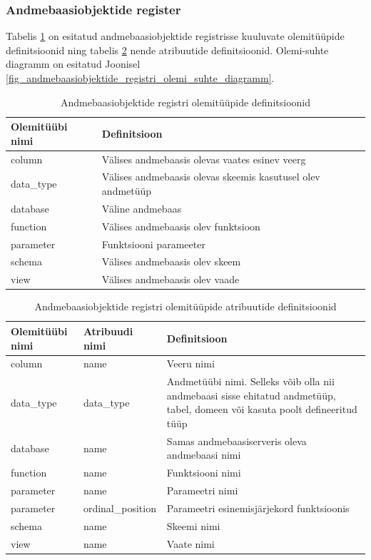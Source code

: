 \documentclass[a4paper,12pt]{article} %
\begin{document}
\subsubsection{Andmebaasiobjektide register}
Tabelis \ref{table_er_andmebaasiobjektide_registri_olemitüüpide_definitsioonid} on esitatud andmebaasiobjektide registrisse kuuluvate olemitüüpide definitsioonid ning tabelis \ref{table_er_andmebaasiobjektide_registri_olemitüüpide_atribuutide_definitsioonid} nende atribuutide definitsioonid. Olemi-suhte diagramm on esitatud Joonisel \ref{fig_andmebaasiobjektide_registri_olemi_suhte_diagramm}.

\begin{table}[H]
\centering
\caption{Andmebaasiobjektide registri olemitüüpide definitsioonid}
\label{table_er_andmebaasiobjektide_registri_olemitüüpide_definitsioonid}
\begin{tabular}{|p{4cm}|p{11cm}|}
\hline
\rowcolor{rowgray}
Olemitüübi nimi & Definitsioon \\ \hline
column & Välises andmebaasis olevas vaates esinev veerg\\ \hline
data\_type & Välises andmebaasis olevas skeemis kasutusel olev andmetüüp\\ \hline
database & Väline andmebaas \\ \hline
function & Välises andmebaasis olev funktsioon\\ \hline
parameter & Funktsiooni parameeter\\ \hline
schema & Välises andmebaasis olev skeem\\ \hline
view & Välises andmebaasis olev vaade\\ \hline
\end{tabular}
\end{table}

\begin{table}[H]
\centering
\caption{Andmebaasiobjektide registri olemitüüpide atribuutide definitsioonid}
\label{table_er_andmebaasiobjektide_registri_olemitüüpide_atribuutide_definitsioonid}
\begin{tabular}{|p{4cm}|p{4cm}|p{7cm}|}
\hline
\rowcolor{rowgray}
Olemitüübi nimi & Atribuudi nimi & Definitsioon \\ \hline
column & name & Veeru nimi \\ \hline
data\_type & data\_type & Andmetüübi nimi. Selleks võib olla nii andmebaasi sisse ehitatud andmetüüp, tabel, domeen või kasuta poolt defineeritud tüüp \\ \hline
database & name & Samas andmebaasiserveris oleva andmebaasi nimi \\ \hline
function & name & Funktsiooni nimi \\ \hline
parameter & name & Parameetri nimi \\ \hline
parameter & ordinal\_position & Parameetri esinemisjärjekord funktsioonis \\ \hline
schema & name & Skeemi nimi \\ \hline
view & name & Vaate nimi \\ \hline
\end{tabular}
\end{table}
\end{document}
